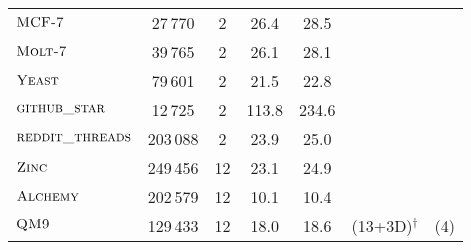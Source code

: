 \documentclass{article}
\theoremstyle{definition}
\newcommand{\cmark}{\ding{51}}
\newcommand{\xmark}{\ding{55}}
\begin{document}
\begin{table}[h]
\begin{center}
{\begin{tabular}{@{}lcccccc@{}}
				$\textsc{MCF-7}$       & 27\,770  & 2	&	26.4	&	 28.5               & \cmark  & \cmark           \\
					
				$\textsc{Molt-7}$       & 39\,765  &	2	&	26.1	&	     	28.1          & \cmark  & \cmark           \\
				$\textsc{Yeast}$       &   79\,601&	2&	21.5&	22.8                & \cmark  & \cmark           \\
				$\textsc{github\_star}$       &  12\,725 & 2	& 	113.8		&	234.6               & \xmark  & \xmark           \\
				$\textsc{reddit\_threads}$   &	203\,088	  & 2  &	23.9 &	25.0  		               & \xmark  & \xmark           \\
				\midrule        
				$\textsc{Zinc}$       &  249\,456 &12	&23.1 &	24.9     & \cmark  & \cmark           \\
				$\textsc{Alchemy}$       & 202\,579 &12	& 10.1 &	10.4 	     & \cmark  & \cmark           \\
				$\textsc{QM9}$       &129\,433  &12	& 18.0 &	18.6     & \cmark (13+3D)$^\dagger$  & \cmark (4)          \\
				\bottomrule
		\end{tabular}}
		\label{ds}
	\end{center}
\end{table}
\end{document}
